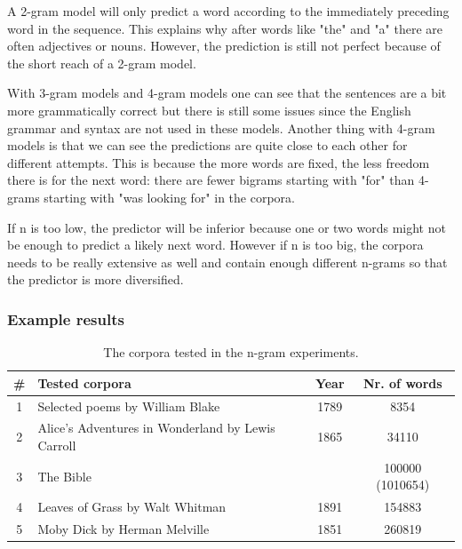 \documentclass[a4paper,12pt]{article}
\begin{document}
A 2-gram model will only predict a word according to the immediately preceding word in the sequence. This explains why after words like "the" and "a" there are often adjectives or nouns. However, the prediction is still not perfect because of the short reach of a 2-gram model.

With 3-gram models and 4-gram models one can see that the sentences are a bit more grammatically correct but there is still some issues since the English grammar and syntax are not used in these models. Another thing with 4-gram models is that we can see the predictions are quite close to each other for different attempts. This is because the more words are fixed, the less freedom there is for the next word: there are fewer bigrams starting with "for" than 4-grams starting with "was looking for" in the corpora.
	
If n is too low, the predictor will be inferior because one or two words might not be enough to predict a likely next word. However if n is too big, the corpora needs to be really extensive as well and contain enough different n-grams so that the predictor is more diversified.

\subsubsection{Example results}
\begin{table}
\small
\begin{center}
\begin{tabular}{|c|l|c|c|}
\hline
\# & Tested corpora & Year & Nr. of words\\ \hline
1 & Selected poems by William Blake & 1789 & 8354 \\ \hline
2 & Alice's Adventures in Wonderland by Lewis Carroll & 1865 & 34110 \\ \hline
3 & The Bible & & 100000 (1010654) \\ \hline
4 & Leaves of Grass by Walt Whitman & 1891 & 154883\\ \hline
5 & Moby Dick by Herman Melville & 1851 & 260819\\ \hline
\end{tabular}
\caption{The corpora tested in the n-gram experiments.}
\label{tab:corplist}
\end{center}
\end{table}
\end{document}
